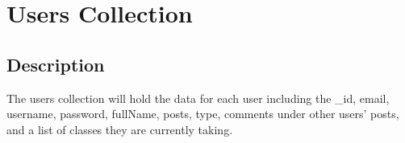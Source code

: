 \documentclass[preprint,11pt,3p]{article}
\author{%
    Eric Altenburg \\
    \texttt{ealtenbu@stevens.edu}\vspace{20pt} \\
   	Daniel Kimball \\
    \texttt{dkimball@stevens.edu}\vspace{20pt} \\
    Hamzah Nizami \\
    \texttt{hnizami1@stevens.edu}\vspace{20pt} \\
    Max Shi \\
    \texttt{mshi7@stevens.edu}
    }
\makeatletter
\def\printauthor{%
    {\large \@author}}
\newcommand\titlepagedecoration{%
\begin{tikzpicture}[remember picture,overlay,shorten >= -10pt]

	\coordinate (aux1) at ([yshift=-15pt]current page.north east);
	\coordinate (aux2) at ([yshift=-410pt]current page.north east);
	\coordinate (aux3) at ([xshift=-4.5cm]current page.north east);
	\coordinate (aux4) at ([yshift=-150pt]current page.north east);

	\begin{scope}[titlepagecolor!40,line width=12pt,rounded corners=12pt]
		\draw
		  (aux1) -- coordinate (a)
		  ++(225:5) --
		  ++(-45:5.1) coordinate (b);
		\draw[shorten <= -10pt]
		  (aux3) --
		  (a) --
		  (aux1);
		\draw[opacity=0.6,titlepagecolor,shorten <= -10pt]
		  (b) --
		  ++(225:2.2) --
		  ++(-45:2.2);
	\end{scope}
	\draw[titlepagecolor,line width=8pt,rounded corners=8pt,shorten <= -10pt]
	  (aux4) --
	  ++(225:0.8) --
	  ++(-45:0.8);
	\begin{scope}[titlepagecolor!70,line width=6pt,rounded corners=8pt]
		\draw[shorten <= -10pt]
		  (aux2) --
		  ++(225:3) coordinate[pos=0.45] (c) --
		  ++(-45:3.1);
		\draw
		  (aux2) --
		  (c) --
		  ++(135:2.5) --
		  ++(45:2.5) --
		  ++(-45:2.5) coordinate[pos=0.3] (d);   
		\draw 
		  (d) -- +(45:1);
	\end{scope}
\end{tikzpicture}%
}
\makeatother
\begin{document}




\newpage

\tableofcontents
\newpage



\section{Users Collection}

\subsection{Description}
	The users collection will hold the data for each user including the _id, email, username, password, fullName, posts, type, comments under other users' posts, and a list of classes they are currently taking.
\end{document}
